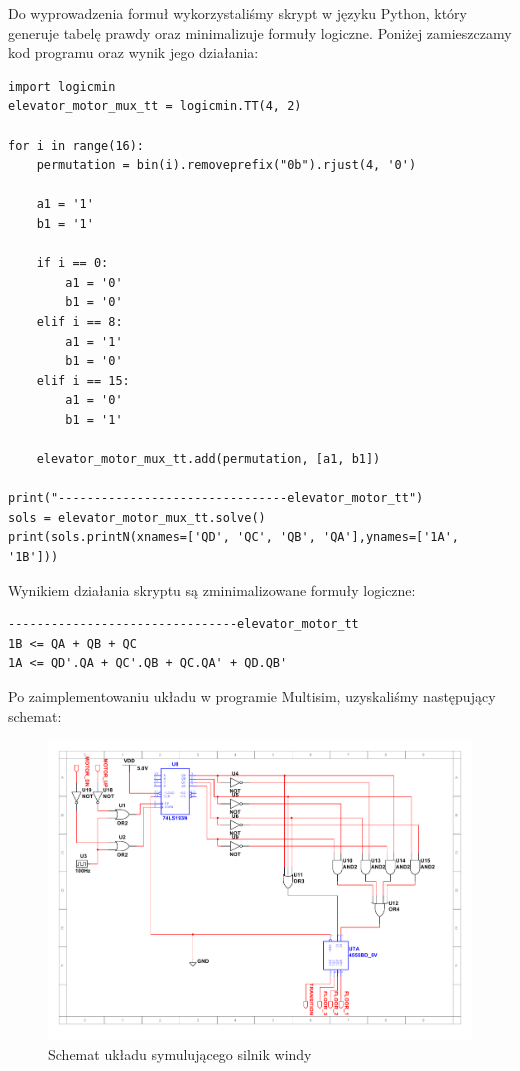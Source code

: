 \documentclass[a4paper]{article}
\begin{document}
Do wyprowadzenia formuł wykorzystaliśmy skrypt w języku Python, który generuje tabelę prawdy oraz
minimalizuje formuły logiczne. Poniżej zamieszczamy kod programu oraz wynik jego działania:
\begin{verbatim}
import logicmin
elevator_motor_mux_tt = logicmin.TT(4, 2)

for i in range(16):
    permutation = bin(i).removeprefix("0b").rjust(4, '0')
    
    a1 = '1'
    b1 = '1'

    if i == 0:
        a1 = '0'
        b1 = '0'
    elif i == 8:
        a1 = '1'
        b1 = '0'
    elif i == 15:
        a1 = '0'
        b1 = '1'

    elevator_motor_mux_tt.add(permutation, [a1, b1])

print("--------------------------------elevator_motor_tt")
sols = elevator_motor_mux_tt.solve()
print(sols.printN(xnames=['QD', 'QC', 'QB', 'QA'],ynames=['1A', '1B']))
\end{verbatim}
Wynikiem działania skryptu są zminimalizowane formuły logiczne:

\begin{verbatim}
--------------------------------elevator_motor_tt
1B <= QA + QB + QC
1A <= QD'.QA + QC'.QB + QC.QA' + QD.QB'
\end{verbatim}

Po zaimplementowaniu układu w programie Multisim, uzyskaliśmy następujący schemat:
\begin{figure}[H]
    \centering
    \includegraphics[width=\textwidth]{elevator_motor_simulator_schemat.pdf}
    \caption{Schemat układu symulującego silnik windy}
\end{figure}
\end{document}
